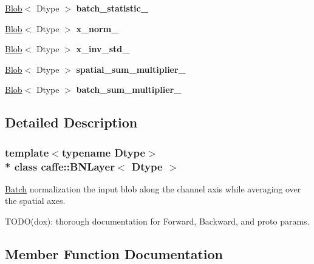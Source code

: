 \begin{DoxyCompactItemize}
\item 
\hyperlink{classcaffe_1_1Blob}{Blob}$<$ Dtype $>$ {\bfseries batch\+\_\+statistic\+\_\+}\hypertarget{classcaffe_1_1BNLayer_af665ea3902f0001f9fbabb8f0fd87f12}{}\label{classcaffe_1_1BNLayer_af665ea3902f0001f9fbabb8f0fd87f12}

\item 
\hyperlink{classcaffe_1_1Blob}{Blob}$<$ Dtype $>$ {\bfseries x\+\_\+norm\+\_\+}\hypertarget{classcaffe_1_1BNLayer_aa4bb5f65a270d6e6fb18d23a21a0160f}{}\label{classcaffe_1_1BNLayer_aa4bb5f65a270d6e6fb18d23a21a0160f}

\item 
\hyperlink{classcaffe_1_1Blob}{Blob}$<$ Dtype $>$ {\bfseries x\+\_\+inv\+\_\+std\+\_\+}\hypertarget{classcaffe_1_1BNLayer_ac131b1225547fea43443d41276c4b47a}{}\label{classcaffe_1_1BNLayer_ac131b1225547fea43443d41276c4b47a}

\item 
\hyperlink{classcaffe_1_1Blob}{Blob}$<$ Dtype $>$ {\bfseries spatial\+\_\+sum\+\_\+multiplier\+\_\+}\hypertarget{classcaffe_1_1BNLayer_afd96aed6cc5fac07d7c251ba52c0fc76}{}\label{classcaffe_1_1BNLayer_afd96aed6cc5fac07d7c251ba52c0fc76}

\item 
\hyperlink{classcaffe_1_1Blob}{Blob}$<$ Dtype $>$ {\bfseries batch\+\_\+sum\+\_\+multiplier\+\_\+}\hypertarget{classcaffe_1_1BNLayer_a70d55694327c4ac7cc26c11f7f0e193d}{}\label{classcaffe_1_1BNLayer_a70d55694327c4ac7cc26c11f7f0e193d}

\end{DoxyCompactItemize}


\subsection{Detailed Description}
\subsubsection*{template$<$typename Dtype$>$\\*
class caffe\+::\+B\+N\+Layer$<$ Dtype $>$}

\hyperlink{classcaffe_1_1Batch}{Batch} normalization the input blob along the channel axis while averaging over the spatial axes. 

T\+O\+D\+O(dox)\+: thorough documentation for Forward, Backward, and proto params. 

\subsection{Member Function Documentation}

